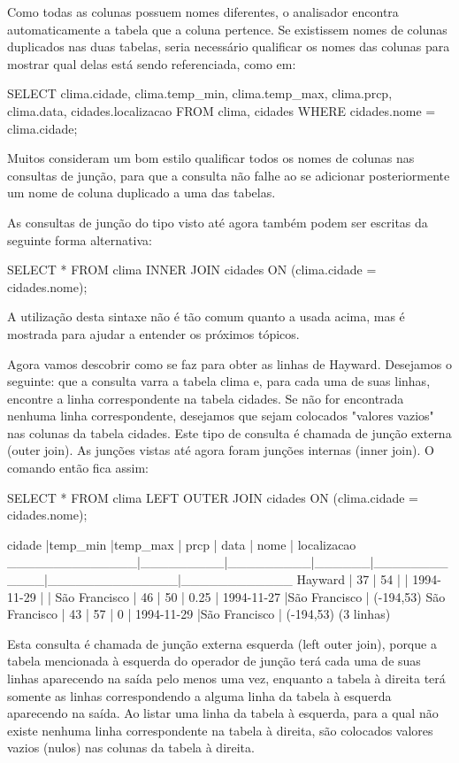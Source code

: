 Como todas as colunas possuem nomes diferentes, o analisador encontra automaticamente a tabela que a coluna pertence. Se existissem nomes de colunas duplicados nas duas tabelas, seria necessário qualificar os nomes das colunas para mostrar qual delas está sendo referenciada, como em:
\begin{BoxVerbatim}
SELECT clima.cidade, clima.temp_min, clima.temp_max,
       clima.prcp, clima.data, cidades.localizacao
   FROM clima, cidades
   WHERE cidades.nome = clima.cidade;
\end{BoxVerbatim}

Muitos consideram um bom estilo qualificar todos os nomes de colunas nas consultas de junção, para que a consulta não falhe ao se adicionar posteriormente um nome de coluna duplicado a uma das tabelas.

As consultas de junção do tipo visto até agora também podem ser escritas da seguinte forma alternativa:
\begin{BoxVerbatim}
SELECT *
    FROM clima INNER JOIN cidades ON (clima.cidade = cidades.nome);
\end{BoxVerbatim}

A utilização desta sintaxe não é tão comum quanto a usada acima, mas é mostrada para ajudar a entender os próximos tópicos.

Agora vamos descobrir como se faz para obter as linhas de Hayward. Desejamos o seguinte: que a consulta varra a tabela clima e, para cada uma de suas linhas, encontre a linha correspondente na tabela cidades. Se não for encontrada nenhuma linha correspondente, desejamos que sejam colocados "valores vazios" nas colunas da tabela cidades. Este tipo de consulta é chamada de junção externa (outer join). As junções vistas até agora foram junções internas (inner join). O comando então fica assim:
\begin{BoxVerbatim}
SELECT *
    FROM clima LEFT OUTER JOIN cidades ON (clima.cidade = cidades.nome);


cidade        |temp_min |temp_max | prcp |    data    |    nome      | localizacao
______________|_________|_________|______|____________|______________|____________
Hayward       |      37 |      54 |      | 1994-11-29 |              |
São Francisco |      46 |      50 | 0.25 | 1994-11-27 |São Francisco | (-194,53)
São Francisco |      43 |      57 |    0 | 1994-11-29 |São Francisco | (-194,53)
(3 linhas)
\end{BoxVerbatim}

Esta consulta é chamada de junção externa esquerda (left outer join), porque a tabela mencionada à esquerda do operador de junção terá cada uma de suas linhas aparecendo na saída pelo menos uma vez, enquanto a tabela à direita terá somente as linhas correspondendo a alguma linha da tabela à esquerda aparecendo na saída. Ao listar uma linha da tabela à esquerda, para a qual não existe nenhuma linha correspondente na tabela à direita, são colocados valores vazios (nulos) nas colunas da tabela à direita.

